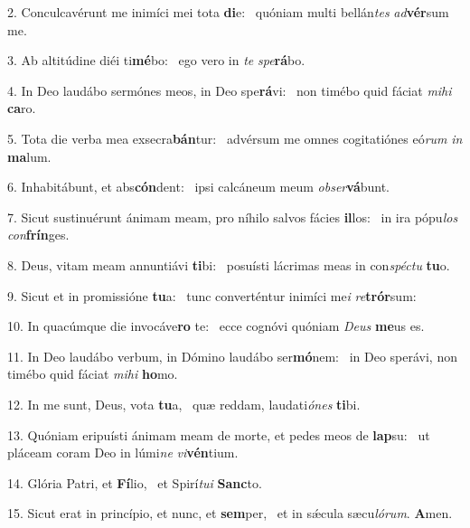 2. Conculcavérunt me inimíci mei tota \textbf{di}e: \ast\  quóniam multi bellán\textit{tes} \textit{ad}\textbf{vér}sum me.\

3. Ab altitúdine diéi ti\textbf{mé}bo: \ast\  ego vero in \textit{te} \textit{spe}\textbf{rá}bo.\

4. In Deo laudábo sermónes meos, in Deo spe\textbf{rá}vi: \ast\  non timébo quid fáciat \textit{mi}\textit{hi} \textbf{ca}ro.\

5. Tota die verba mea exsecra\textbf{bán}tur: \ast\  advérsum me omnes cogitatiónes eó\textit{rum} \textit{in} \textbf{ma}lum.\

6. Inhabitábunt, et abs\textbf{cón}dent: \ast\  ipsi calcáneum meum \textit{ob}\textit{ser}\textbf{vá}bunt.\

7. Sicut sustinuérunt ánimam meam, pro níhilo salvos fácies \textbf{il}los: \ast\  in ira pópu\textit{los} \textit{con}\textbf{frín}ges.\

8. Deus, vitam meam annuntiávi \textbf{ti}bi: \ast\  posuísti lácrimas meas in con\textit{spéc}\textit{tu} \textbf{tu}o.\

9. Sicut et in promissióne \textbf{tu}a: \ast\  tunc converténtur inimíci me\textit{i} \textit{re}\textbf{trór}sum:\

10. In quacúmque die invocáve\textbf{ro} te: \ast\  ecce cognóvi quóniam \textit{De}\textit{us} \textbf{me}us es.\

11. In Deo laudábo verbum, in Dómino laudábo ser\textbf{mó}nem: \ast\  in Deo sperávi, non timébo quid fáciat \textit{mi}\textit{hi} \textbf{ho}mo.\

12. In me sunt, Deus, vota \textbf{tu}a, \ast\  quæ reddam, laudati\textit{ó}\textit{nes} \textbf{ti}bi.\

13. Quóniam eripuísti ánimam meam de morte, et pedes meos de \textbf{lap}su: \ast\  ut pláceam coram Deo in lúmi\textit{ne} \textit{vi}\textbf{vén}tium.\

14. Glória Patri, et \textbf{Fí}lio, \ast\  et Spirí\textit{tu}\textit{i} \textbf{Sanc}to.\

15. Sicut erat in princípio, et nunc, et \textbf{sem}per, \ast\  et in sǽcula sæcu\textit{ló}\textit{rum}. \textbf{A}men.\

